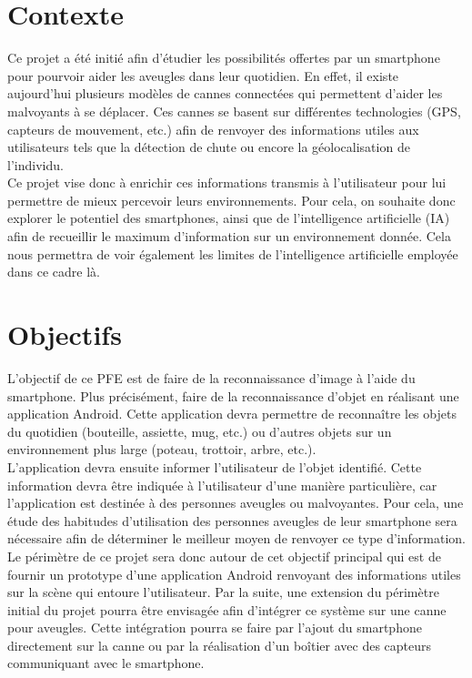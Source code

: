 \documentclass[UTF8]{EPURapport}
\begin{document}
\section{Contexte}

Ce projet a été initié afin d'étudier les possibilités offertes par un smartphone pour pourvoir aider les aveugles dans leur quotidien. En effet, il existe aujourd'hui plusieurs modèles de cannes connectées qui permettent d'aider les malvoyants à se déplacer. Ces cannes se basent sur différentes technologies (GPS, capteurs de mouvement, etc.) afin de renvoyer des informations utiles aux utilisateurs tels que la détection de chute ou encore la géolocalisation de l'individu.\\

Ce projet vise donc à enrichir ces informations transmis à l'utilisateur pour lui permettre de mieux percevoir leurs environnements. Pour cela, on souhaite donc explorer le potentiel des smartphones, ainsi que de l'intelligence artificielle (IA) afin de recueillir le maximum d'information sur un environnement donnée. Cela nous permettra de voir également les limites de l'intelligence artificielle employée dans ce cadre là.

\section{Objectifs}

L'objectif de ce PFE est de faire de la reconnaissance d'image à l'aide du smartphone. Plus précisément, faire de la reconnaissance d'objet en réalisant une application Android. Cette application devra permettre de reconnaître les objets du quotidien (bouteille, assiette, mug, etc.) ou d'autres objets sur un environnement plus large (poteau, trottoir, arbre, etc.).\\

L’application devra ensuite informer l’utilisateur de l’objet identifié. Cette information devra être indiquée à l’utilisateur d’une manière particulière, car l’application est destinée à des personnes aveugles ou malvoyantes. Pour cela, une étude des habitudes d'utilisation des personnes aveugles de leur smartphone sera nécessaire afin de déterminer le meilleur moyen de renvoyer ce type d'information.\\

Le périmètre de ce projet sera donc autour de cet objectif principal qui est de fournir un prototype d'une application Android renvoyant des informations utiles sur la scène qui entoure l'utilisateur. Par la suite, une extension du périmètre initial du projet pourra être envisagée afin d'intégrer ce système sur une canne pour aveugles. Cette intégration pourra se faire par l'ajout du smartphone directement sur la canne ou par la réalisation d'un boîtier avec des capteurs communiquant avec le smartphone.\\
\end{document}

